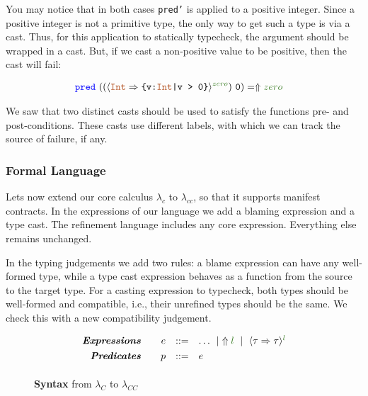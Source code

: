 You may notice that in both cases \texttt{pred'} is applied to a 
positive integer.
Since a positive integer is not a primitive type, 
the only way to get such a type is via a cast.
Thus, for this application to statically typecheck, the argument should 
be wrapped in a cast.
But, if we cast a non-positive value to be positive,
then the cast will fail:

\begin{align*}
\predname \ ((\ecast{\tyint}{\ttpos}{zero})\ \texttt{0}) &= \elabel{zero}
\end{align*}

We saw that two distinct casts should be used to satisfy the functions pre- and post-conditions.
These casts use different labels, with which we can track the source of failure, if any.

\subsubsection{Formal Language}
Lets now extend our core calculus $\lambda_c$ to $\lambda_{cc}$,
so that it supports manifest contracts.
%
In the expressions of our language we add a blaming expression
and a type cast.
The refinement language includes any core expression.
Everything else remains unchanged.


In the typing judgements we add two rules:
a blame expression can have any well-formed type, 
while a type cast expression behaves as a function from the 
source to the target type.
For a casting expression to typecheck, both types should be 
well-formed and compatible, i.e., their unrefined types should be 
the same. We check this with a new compatibility judgement.

\begin{figure}[ht!]
\centering
$$
\begin{array}{rrcl}
\emphbf{Expressions} \quad 
  & e 
  & ::= 
  & 		 \dots
  \spmid \elabel{l} 
  \spmid \ecast{\tau}{\tau}{l} 
  \\[0.05in] 

\emphbf{Predicates} \quad 
  & p
  & ::= 
  &		e
  \\[0.05in] 

\end{array}
$$
\caption{\textbf{Syntax} from $\lambda_C$ to $\lambda_{CC}$}
\label{fig:syntax}
\end{figure}



